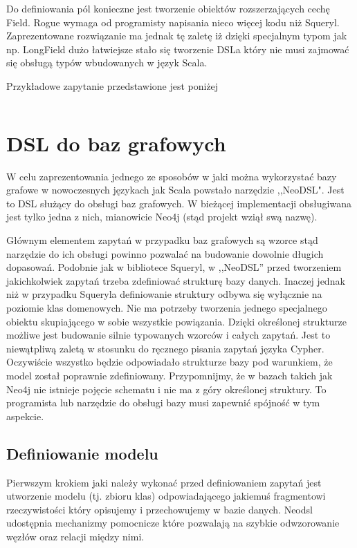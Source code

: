 \documentclass[brudnopis]{xmgr}
\begin{document}
Do definiowania pól konieczne jest tworzenie obiektów rozszerzających cechę Field. Rogue wymaga od programisty napisania nieco więcej kodu niż Squeryl. Zaprezentowane rozwiązanie ma jednak tę zaletę iż dzięki specjalnym typom jak np. LongField dużo łatwiejsze stało się tworzenie DSLa który nie musi zajmować się obsługą typów wbudowanych w język Scala.

Przykładowe zapytanie przedstawione jest poniżej

\inputminted{scala}{listings/scala/rogue-query.scala}

\chapter{DSL do baz grafowych}

W celu zaprezentowania jednego ze sposobów w jaki można wykorzystać bazy grafowe w nowoczesnych językach jak Scala powstało narzędzie ,,NeoDSL". Jest to DSL służący do obsługi baz grafowych. W bieżącej implementacji obsługiwana jest tylko jedna z nich, mianowicie Neo4j (stąd projekt wziął swą nazwę). 

Głównym elementem zapytań w przypadku baz grafowych są wzorce stąd narzędzie do ich obsługi powinno pozwalać na budowanie dowolnie długich dopasowań. Podobnie jak w bibliotece Squeryl, w ,,NeoDSL'' przed tworzeniem jakichkolwiek zapytań trzeba zdefiniować strukturę bazy danych. Inaczej jednak niż w przypadku Squeryla definiowanie struktury odbywa się wyłącznie na poziomie klas domenowych. Nie ma potrzeby tworzenia jednego specjalnego obiektu skupiającego w sobie wszystkie powiązania. Dzięki określonej strukturze możliwe jest budowanie silnie typowanych wzorców i całych zapytań. Jest to niewątpliwą zaletą w stosunku do ręcznego pisania zapytań języka Cypher. Oczywiście wszystko będzie odpowiadało strukturze bazy pod warunkiem, że model został poprawnie zdefiniowany. Przypomnijmy, że w bazach takich jak Neo4j nie istnieje pojęcie schematu i nie ma z góry określonej struktury. To programista lub narzędzie do obsługi bazy musi zapewnić spójność w tym aspekcie.

\section{Definiowanie modelu}

Pierwszym krokiem jaki należy wykonać przed definiowaniem zapytań jest utworzenie modelu (tj. zbioru klas) odpowiadającego jakiemuś fragmentowi rzeczywistości który opisujemy i przechowujemy w bazie danych. Neodsl udostępnia mechanizmy pomocnicze które pozwalają na szybkie odwzorowanie węzłów oraz relacji między nimi.
\end{document}
